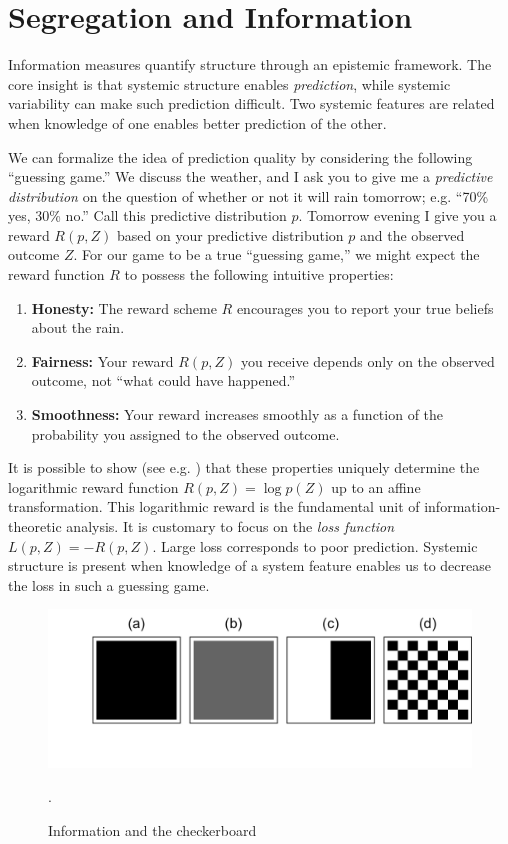 \documentclass[english]{scrartcl}
\begin{document}
\section{Segregation and Information} \label{sec:information}
	Information measures quantify structure through an epistemic framework. The core insight is that systemic structure enables \emph{prediction}, while systemic variability can make such prediction difficult. Two systemic features are related when knowledge of one enables better prediction of the other. 

	We can formalize the idea of prediction quality by considering the following ``guessing game.'' We discuss the weather, and I ask you to give me a \emph{predictive distribution} on the question of whether or not it will rain tomorrow; e.g. ``70\% yes, 30\% no.'' Call this predictive distribution $p$. Tomorrow evening I give you a reward $R(p,Z)$ based on your predictive distribution $p$ and the observed outcome $Z$. For our game to be a true ``guessing game,'' we might expect the reward function $R$ to possess the following intuitive properties: 
	\begin{enumerate}
		\item \textbf{Honesty:} The reward scheme $R$ encourages you to report your true beliefs about the rain.
		\item \textbf{Fairness:} Your reward $R(p,Z)$ you receive depends only on the observed outcome, not ``what could have happened.''
		\item \textbf{Smoothness:} Your reward increases smoothly as a function of the probability you assigned to the observed outcome. 
	\end{enumerate}
	It is possible to show (see e.g. \cite{Cover1991}) that these properties uniquely determine the logarithmic reward function $R(p,Z) = \log p(Z)$ up to an affine transformation. This logarithmic reward is the fundamental unit of information-theoretic analysis. It is customary to focus on the \emph{loss function} $L(p,Z) = - R(p,Z)$. Large loss corresponds to poor prediction. Systemic structure is present when knowledge of a system feature enables us to decrease the loss in such a guessing game. 

	\begin{figure}
		\includegraphics[width=\textwidth]{figs/checkerboard.png}
		\caption{Information and the checkerboard}. \label{fig:checkerboard}
	\end{figure}
\end{document}
